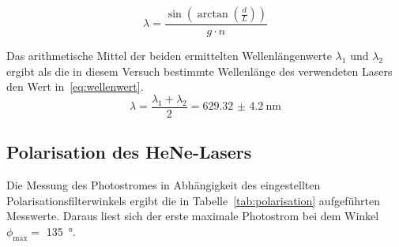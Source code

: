 \begin{equation}
\lambda = \frac{\sin{\left(\arctan{\left(\frac{d}{L}\right)}\right)}} 
{g\cdot n}
\label{eq:wellenlaenge}
\end{equation}
%

Das arithmetische Mittel der beiden ermittelten Wellenlängenwerte 	
$\lambda_1$ und $\lambda_2$ ergibt als die in diesem Versuch 
bestimmte Wellenlänge des verwendeten Lasers den Wert 
in~\eqref{eq:wellenwert}.
\begin{equation}
\lambda = \frac{\lambda_1 + \lambda_2}{2} = \SI{629.32(420)}{\nano\metre}
\label{eq:wellenwert}
\end{equation}
%
\subsection{Polarisation des HeNe-Lasers}
%

Die Messung des Photostromes in Abhängigkeit des eingestellten 
Polarisationsfilterwinkels ergibt die in 
Tabelle~\ref{tab:polarisation} aufgeführten Messwerte. Daraus liest 
sich der erste maximale Photostrom bei dem Winkel 
$\phi_\text{max} =$ \SI{135}{\degree}. 
%

